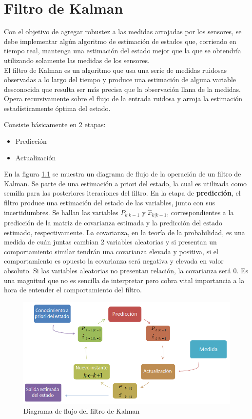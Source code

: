 \documentclass[main]{subfiles}
\begin{document}
\chapter{Filtro de Kalman}

Con el objetivo de agregar robustez a las medidas arrojadas por los sensores, se debe implementar algún algoritmo de estimación de estados que, corriendo en tiempo real, mantenga una estimación del estado mejor que la que se obtendría utilizando solamente las medidas de los sensores.\\

El filtro de Kalman es un algoritmo que usa una serie de medidas ruidosas observadas a lo largo del tiempo y produce una estimación de alguna variable desconocida que resulta ser más precisa que la observación llana de la medidas. Opera recursivamente sobre el flujo de la entrada ruidosa y arroja la estimación estadísticamente óptima del estado.

Consiste básicamente en 2 etapas:
\begin{itemize}
  \item Predicción
  \item Actualización
\end{itemize}

En la figura \ref{fig:kal} se muestra un diagrama de flujo de la operación de un filtro de Kalman. Se parte de una estimación a priori del estado, la cual es utilizada como semilla para las posteriores iteraciones del filtro. En la etapa de \textbf{predicción}, el filtro produce una estimación del estado de las variables, junto con sus incertidumbres. Se hallan las variables $P_{k|k-1}$ y $\hat{x}_{k|k-1}$, correspondientes a la predicción de la matriz de covarianza estimada y la predicción del estado estimado, respectivamente. La covarianza, en la teoría de la probabilidad, es una medida de cuán juntas cambian 2 variables aleatorias y si presentan un comportamiento similar tendrán una covarianza elevada y positiva, si el comportamiento es opuesto la covarianza será negativa y elevada en valor absoluto. Si las variables aleatorias no presentan relación, la covarianza será 0. Es una magnitud que no es sencilla de interpretar pero cobra vital importancia a la hora de entender el comportamiento del filtro.

\begin{figure}[h!]
	\centering
	\includegraphics[width=.8\textwidth]{./pics_kalman/kal.png}
	\caption{Diagrama de flujo del filtro de Kalman}
	\label{fig:kal}
\end{figure}
\end{document}

